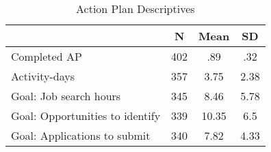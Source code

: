 \begin{table}[htbp]
\caption{\label{clabel} Action Plan Descriptives \label{tab:apstats}}\centering\medskip
\begin{tabular}{lccc} \hline \hline
 & N  & Mean  & SD  \\  \hline 
Completed AP & 402 & .89 & .32 \\  
Activity-days & 357 & 3.75 & 2.38 \\  
Goal: Job search hours & 345 & 8.46 & 5.78 \\  
Goal: Opportunities to identify & 339 & 10.35 & 6.5 \\  
Goal: Applications to submit & 340 & 7.82 & 4.33 \\  
\hline \hline \end{tabular}
\end{table}
